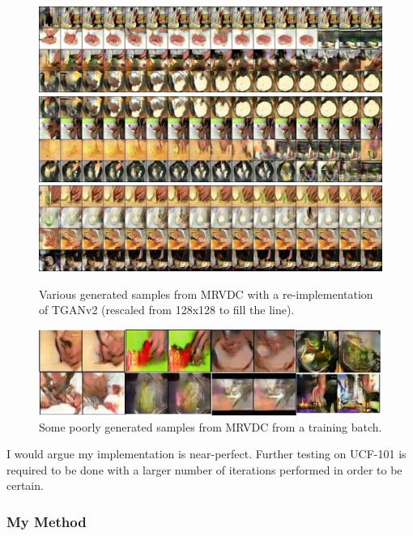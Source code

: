 \documentclass{report}
\theoremstyle{plain}
\theoremstyle{definition}
\theoremstyle{remark}
\numberwithin{equation}{section}
\numberwithin{figure}{section}
\newcommand{\<}{\langle}
\renewcommand{\>}{\rangle}
\begin{document}
\begin{figure}[H]
    \label{fig:uncond_mr}
    \centering
    \caption{Various generated samples from MRVDC with a re-implementation of TGANv2 (rescaled from 128x128 to fill the line). }
    \includegraphics[width=0.95\linewidth]{images/uncond_mr/1.jpg}\\
    \includegraphics[width=0.95\linewidth]{images/uncond_mr/2.jpg}\\
    \includegraphics[width=0.95\linewidth]{images/uncond_mr/3.jpg}
\end{figure}

\begin{figure}[H]
    \label{fig:uncond_mr}
    \centering
    \caption{Some poorly generated samples from MRVDC from a training batch. }
    \includegraphics[width=0.8\linewidth]{images/unconditional_bad.png}
\end{figure}

I would argue my implementation is near-perfect. Further testing on UCF-101 \cite{noauthor_ucf101_nodate} is required to be done with a larger number of iterations performed in order to be certain.

\subsubsection{My Method}
\end{document}
